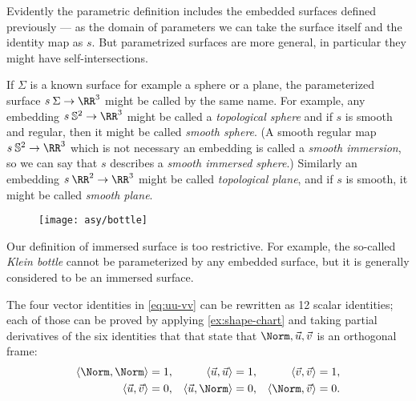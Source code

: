 Evidently the parametric definition includes the embedded surfaces defined previously --- as the domain of parameters we can take the surface itself and the identity map as $s$.
But parametrized surfaces are more general, in particular they  might  have self-intersections.

If $\Sigma$ is a known surface for example a sphere or a plane, the parameterized surface $s\:\Sigma\to\RR^3$ might be called by the same name.
For example, any embedding $s\:\mathbb{S}^2\to\RR^3$ might be called a \emph{topological sphere}
and if $s$ is smooth and regular, then it might be called \emph{smooth sphere}.
(A smooth regular map $s\:\mathbb{S}^2\to\RR^3$ which is not necessary an embedding is called a \emph{smooth immersion}, so we can say that $s$ describes a \emph{smooth immersed sphere}.) 
Similarly an embedding $s\:\RR^2\to\RR^3$ might be called \emph{topological plane},
and if $s$ is smooth, it might be called \emph{smooth plane}.

\begin{wrapfigure}{o}{52 mm}
\vskip-0mm
\centering
\texttt{[image: asy/bottle]}
\vskip0mm
\end{wrapfigure}

Our definition of immersed surface is too restrictive.
For example, the so-called \emph{Klein bottle} cannot be parameterized by any embedded surface, but it is generally considered to be an immersed surface.



















The four vector identities in \ref{eq:uu-vv} can be
rewritten as 12 scalar identities;
each of those can be proved by applying  \ref{ex:shape-chart} and taking partial derivatives of the six identities that that state that $\Norm,\vec u,\vec v$ is an orthogonal frame:
\begin{align*}
\langle\Norm,\Norm\rangle&=1,
&
\langle\vec u,\vec u\rangle&=1,
&
\langle\vec v,\vec v\rangle&=1,
\\
\langle\vec u,\vec v\rangle&=0,
&
\langle\vec u,\Norm\rangle&=0,
&
\langle\Norm,\vec v\rangle&=0.
\end{align*}




















